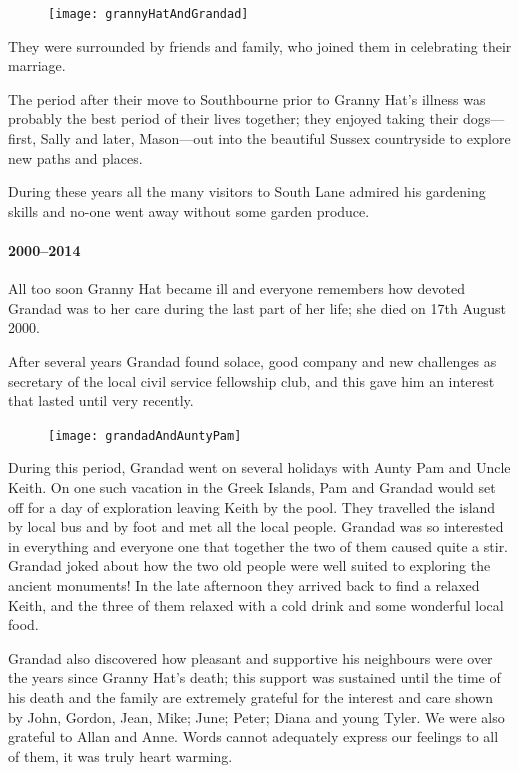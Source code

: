 \begin{figure}
	\centering
	\texttt{[image: grannyHatAndGrandad]}
\end{figure}
They were surrounded by friends and family, who joined them in celebrating their
marriage.

The period after their move to Southbourne  prior to Granny Hat's illness was probably the best period
of their lives together; they enjoyed taking their dogs---first, Sally
and later, Mason---out into the beautiful Sussex countryside to explore new paths and places.

During these years all the many visitors to South Lane admired his gardening skills and no-one went away without some garden produce.

\paragraph{2000--2014}
All too soon Granny Hat became ill and everyone remembers how devoted Grandad was
to her care during the last part of her life; she died on 17th August 2000.

After several years Grandad found solace,  good company and new challenges as
secretary of the local civil service fellowship club, and this gave him an
interest
that lasted until very recently.

\begin{figure}
	\centering
	\texttt{[image: grandadAndAuntyPam]}
\end{figure}
During this period, Grandad went on several holidays with Aunty Pam and Uncle Keith.
On one such vacation in the Greek Islands, Pam and Grandad would set
off for a day of exploration leaving Keith by the pool. They travelled the island
by local bus and by foot and met all the local people. Grandad was so interested in
everything and everyone one that together the two of them caused quite a stir.
Grandad joked about how the two old people were well suited to exploring the
ancient monuments! In the late afternoon they arrived back to find a relaxed
Keith, and the three of them relaxed with a cold drink and some wonderful local
food.

Grandad also discovered how pleasant and supportive his neighbours were over
the years since Granny Hat's death; this support was sustained until the time
of his death
and the family are extremely grateful for the interest and care shown by John,
Gordon, Jean, Mike; June; Peter; Diana and young Tyler. We were also grateful
to Allan and Anne.
Words cannot adequately express  our feelings to all of them, it was truly
heart warming.

